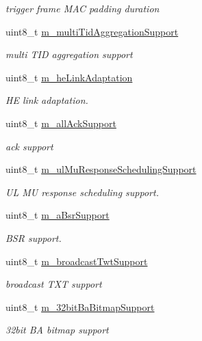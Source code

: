 \begin{DoxyCompactItemize}
\begin{DoxyCompactList}\small\item\em trigger frame M\+AC padding duration \end{DoxyCompactList}\item 
uint8\+\_\+t \hyperlink{classns3_1_1HeCapabilities_a08469c5d5a290f2728c674df38a681a1}{m\+\_\+multi\+Tid\+Aggregation\+Support}
\begin{DoxyCompactList}\small\item\em multi T\+ID aggregation support \end{DoxyCompactList}\item 
uint8\+\_\+t \hyperlink{classns3_1_1HeCapabilities_ae2b5bc6d8d8b218dbac1efdacc689abb}{m\+\_\+he\+Link\+Adaptation}
\begin{DoxyCompactList}\small\item\em HE link adaptation. \end{DoxyCompactList}\item 
uint8\+\_\+t \hyperlink{classns3_1_1HeCapabilities_a36325eaad1246d1ee77dbdbae43c608c}{m\+\_\+all\+Ack\+Support}
\begin{DoxyCompactList}\small\item\em ack support \end{DoxyCompactList}\item 
uint8\+\_\+t \hyperlink{classns3_1_1HeCapabilities_abb88eec28bfa8f93ea73c3643485d33d}{m\+\_\+ul\+Mu\+Response\+Scheduling\+Support}
\begin{DoxyCompactList}\small\item\em UL MU response scheduling support. \end{DoxyCompactList}\item 
uint8\+\_\+t \hyperlink{classns3_1_1HeCapabilities_aa7a38ebf70a7133df40a734171f542b2}{m\+\_\+a\+Bsr\+Support}
\begin{DoxyCompactList}\small\item\em B\+SR support. \end{DoxyCompactList}\item 
uint8\+\_\+t \hyperlink{classns3_1_1HeCapabilities_a4624bbde1e282a55475c95e392f025cf}{m\+\_\+broadcast\+Twt\+Support}
\begin{DoxyCompactList}\small\item\em broadcast T\+XT support \end{DoxyCompactList}\item 
uint8\+\_\+t \hyperlink{classns3_1_1HeCapabilities_a7629d4adebd2aaf5af6838ca23718485}{m\+\_\+32bit\+Ba\+Bitmap\+Support}
\begin{DoxyCompactList}\small\item\em 32bit BA bitmap support \end{DoxyCompactList}\item 

\end{DoxyCompactItemize}
